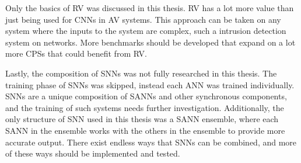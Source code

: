 Only the basics of \ac{RV} was discussed in this thesis.
\ac{RV} has a lot more value than just being used for \acp{CNN} in \ac{AV} systems.
This approach can be taken on any system where the inputs to the system are complex, such a intrusion detection system on networks. 
More benchmarks should be developed that expand on a lot more \acp{CPS} that could benefit from \ac{RV}.

Lastly, the composition of \acp{SNN} was not fully researched in this thesis.
The training phase of \acp{SNN} was skipped, instead each \ac{ANN} was trained individually.
\acp{SNN} are a unique composition of \acp{SANN} and other synchronous components, and the training of such systems needs further investigation.
Additionally, the only structure of \ac{SNN} used in this thesis was a \ac{SANN} ensemble, where each \ac{SANN} in the ensemble works with the others in the ensemble to provide more accurate output.
There exist endless ways that \acp{SNN} can be combined, and more of these ways should be implemented and tested.










